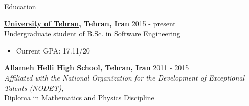 \documentclass{resume} %
\begin{document}

\begin{rSection}{Education}
	
	{\bf \href{http://ut.ac.ir/en}{University of Tehran}, Tehran, Iran} \hfill 2015 - present
	\\Undergraduate student of B.Sc. in Software Engineering
	
	\begin{itemize}
		\item Current GPA: 17.11/20
	\end{itemize}
	
	{\bf \href{http://www.helli.ir/}{Allameh Helli High School}, Tehran, Iran} \hfill 2011 - 2015
	\\\textit{\scriptsize Affiliated with the National Organization for the Development of Exceptional Talents (NODET),}
	\\Diploma in Mathematics and Physics Discipline
	
\end{rSection}
\end{document}
